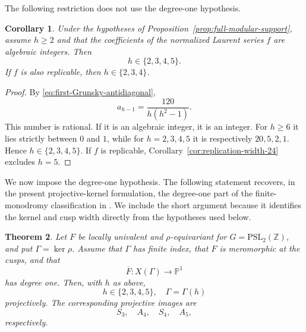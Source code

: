 \documentclass[11pt]{amsart}
\newtheorem{thm}{Theorem}[section]
\newtheorem{cor}[thm]{Corollary}
\theoremstyle{definition}
\theoremstyle{remark}
\numberwithin{equation}{section}
\begin{document}
The following restriction does not use the degree-one hypothesis.

\begin{cor}\label{cor:integral-width-bound}
Under the hypotheses of Proposition~\ref{prop:full-modular-support}, assume $h\geq2$ and that the coefficients of the normalized Laurent series $f$ are algebraic integers.  Then
\[
h\in\{2,3,4,5\}.
\]
If $f$ is also replicable, then $h\in\{2,3,4\}$.
\end{cor}

\begin{proof}
By \eqref{eq:first-Grunsky-antidiagonal},
\[
a_{h-1}=\frac{120}{h(h^2-1)}.
\]
This number is rational.  If it is an algebraic integer, it is an integer.  For $h\geq6$ it lies strictly between $0$ and $1$, while for $h=2,3,4,5$ it is respectively $20,5,2,1$.  Hence $h\in\{2,3,4,5\}$.  If $f$ is replicable, Corollary~\ref{cor:replication-width-24} excludes $h=5$.
\end{proof}

We now impose the degree-one hypothesis. The following statement recovers, in the present projective-kernel formulation, the degree-one part of the finite-monodromy classification in \cite{forum}. We include the short argument because it identifies the kernel and cusp width directly from the hypotheses used below.

\begin{thm}\label{thm:degree-one-kernel-classification}
Let $F$ be locally univalent and $\rho$-equivariant for $G=\mathrm{PSL}_2(\mathbb Z)$, and put $\Gamma=\ker\rho$.  Assume that $\Gamma$ has finite index, that $F$ is meromorphic at the cusps, and that
\[
\overline F:X(\Gamma)\longrightarrow\mathbb P^1
\]
has degree one.  Then, with $h$ as above,
\[
h\in\{2,3,4,5\},
\quad
\Gamma=\Gamma(h)
\]
projectively.  The corresponding projective images are
\[
S_3,\quad A_4,\quad S_4,\quad A_5,
\]
respectively.
\end{thm}
\end{document}
